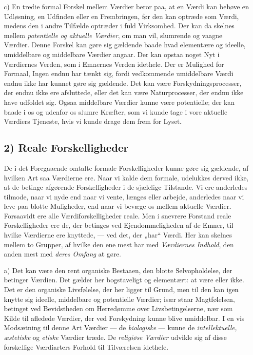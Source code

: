 \documentclass[12pt,a4paper]{book}
\newcommand{\apage}[1]{\marginnote{\footnotesize\textit{[#1]}}}
\begin{document}
c) En tredie formal Forskel mellem Værdier beror paa, at en Værdi kan behøve en
Udløsning, en Udfinden eller en Frembringen, før den kan optræde som Værdi, medens
den i andre Tilfælde optræder i fuld Virksomhed. Der kan da skelnes mellem
\emph{potentielle og aktuelle Værdier}, om man vil, slumrende og vaagne Værdier.
Denne Forskel kan gøre sig gældende baade hvad elementære og ideelle, umiddelbare
og middelbare Værdier angaar. Der kan opstaa noget Nyt i Værdiernes Verden, som i
Emnernes Verden idethele. Der er Mulighed for Formaal, Ingen endnu har tænkt sig,
fordi vedkommende umiddelbare Værdi endnu ikke har kunnet gøre sig gældende. Det
kan være Forskydningsprocesser, der endnu ikke ere afsluttede, eller det kan være
Naturprocesser, der endnu ikke have udfoldet sig. Ogsaa middelbare Værdier kunne
være potentielle; der kan baade i os og udenfor os slumre Kræfter, som vi kunde
tage i vore aktuelle Værdiers Tjeneste, hvis vi kunde drage dem frem for Lyset.

\subsection*{2) Reale Forskelligheder}

De i det Foregaaende omtalte formale Forskelligheder kunne gøre sig gældende, af
hvilken Art saa Værdierne ere. Naar vi kalde dem formale, udelukkes derved ikke,
at de betinge afgørende Forskelligheder i de sjælelige Tilstande. Vi ere
anderledes tilmode, naar vi nyde end naar vi vente, længes eller arbejde,
anderledes naar vi leve paa blotte Muligheder, end naar vi bevæge os mellem
aktuelle Værdier. Forsaavidt ere alle Værdiforskelligheder reale. Men i snevrere
Forstand reale Forskelligheder ere de, der betinges ved Ejendommeligheden af de
Emner, til hvilke Værdierne ere knyttede, --- ved det, der „har“ Værdi. Her kan
skelnes mellem to Grupper, af hvilke den ene mest har med \emph{Værdiernes
Indhold}, den anden mest med \emph{deres Omfang} at gøre.

\apage{244} a) Det kan være den rent organiske Bestaaen, den blotte Selvopholdelse, der
betinger Værdien. Det gælder her bogstaveligt og elementært: at være eller ikke.
Det er den organiske Livsfølelse, der her ligger til Grund, men til den kan igen
knytte sig ideelle, middelbare og potentielle Værdier; især staar Magtfølelsen,
betinget ved Bevidstheden om Herredømme over Livsbetingelserne, nær som Kilde til
afledede Værdier, der ved Forskydning kunne blive umiddelbar. I en vis Modsætning
til denne Art Værdier --- de \emph{biologiske} --- kunne de \emph{intellektuelle, æstetiske} og \emph{etiske} Værdier træde. De \emph{religiøse Værdier} udvikle sig af
disse forskellige Værdiarters Forhold til Tilværelsen idethele.
\end{document}

